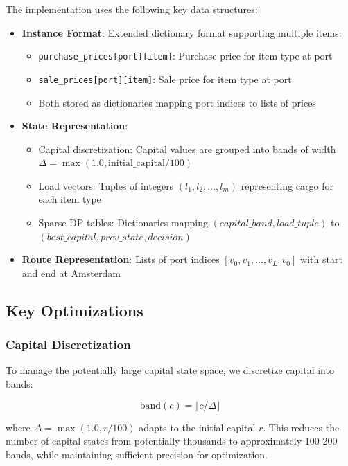 \documentclass[12pt]{article}
\begin{document}
The implementation uses the following key data structures:

\begin{itemize}
    \item \textbf{Instance Format}: Extended dictionary format supporting multiple items:
    \begin{itemize}
        \item \texttt{purchase\_prices[port][item]}: Purchase price for item type at port
        \item \texttt{sale\_prices[port][item]}: Sale price for item type at port
        \item Both stored as dictionaries mapping port indices to lists of prices
    \end{itemize}
    
    \item \textbf{State Representation}: 
    \begin{itemize}
        \item Capital discretization: Capital values are grouped into bands of width $\Delta = \max(1.0, \text{initial\_capital} / 100)$
        \item Load vectors: Tuples of integers $(l_1, l_2, ..., l_m)$ representing cargo for each item type
        \item Sparse DP tables: Dictionaries mapping $(capital\_band, load\_tuple)$ to $(best\_capital, prev\_state, decision)$
    \end{itemize}
    
    \item \textbf{Route Representation}: Lists of port indices $[v_0, v_1, ..., v_L, v_0]$ with start and end at Amsterdam
\end{itemize}

\subsection{Key Optimizations}

\subsubsection{Capital Discretization}

To manage the potentially large capital state space, we discretize capital into bands:

$$\text{band}(c) = \lfloor c / \Delta \rfloor$$

where $\Delta = \max(1.0, r / 100)$ adapts to the initial capital $r$. This reduces the number of capital states from potentially thousands to approximately 100-200 bands, while maintaining sufficient precision for optimization.
\end{document}
